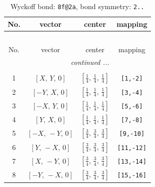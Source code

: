 \documentclass[fleqn,8pt]{jsarticle}
\begin{document}
\begin{longtable}{cccc}
\caption{Wyckoff bond: {\tt 8f@2a}, bond symmetry: {\tt 2..}}
 \\
 \hline \hline
No. & vector & center & mapping \\ \hline \endfirsthead

\multicolumn{3}{l}{\tablename\ \thetable{}} \\
 \hline \hline
No. & vector & center & mapping \\ \hline \endhead

 \hline \hline
\multicolumn{3}{r}{\footnotesize\it continued ...} \\ \endfoot

 \hline \hline
\multicolumn{3}{r}{} \\ \endlastfoot

1 & $\left[ X,\, Y,\, 0 \right]$ & $\left[ \frac{1}{4},\, \frac{1}{4},\, \frac{1}{4} \right]$ & {\tt [1,-2]} \\ \hline
2 & $\left[ - Y,\, X,\, 0 \right]$ & $\left[ \frac{1}{4},\, \frac{1}{4},\, \frac{1}{4} \right]$ & {\tt [3,-4]} \\ \hline
3 & $\left[ - X,\, Y,\, 0 \right]$ & $\left[ \frac{1}{4},\, \frac{1}{4},\, \frac{1}{4} \right]$ & {\tt [5,-6]} \\ \hline
4 & $\left[ Y,\, X,\, 0 \right]$ & $\left[ \frac{1}{4},\, \frac{1}{4},\, \frac{1}{4} \right]$ & {\tt [7,-8]} \\ \hline
5 & $\left[ - X,\, - Y,\, 0 \right]$ & $\left[ \frac{3}{4},\, \frac{3}{4},\, \frac{3}{4} \right]$ & {\tt [9,-10]} \\ \hline
6 & $\left[ Y,\, - X,\, 0 \right]$ & $\left[ \frac{3}{4},\, \frac{3}{4},\, \frac{3}{4} \right]$ & {\tt [11,-12]} \\ \hline
7 & $\left[ X,\, - Y,\, 0 \right]$ & $\left[ \frac{3}{4},\, \frac{3}{4},\, \frac{3}{4} \right]$ & {\tt [13,-14]} \\ \hline
8 & $\left[ - Y,\, - X,\, 0 \right]$ & $\left[ \frac{3}{4},\, \frac{3}{4},\, \frac{3}{4} \right]$ & {\tt [15,-16]} \\
\end{longtable}
\renewcommand{\arraystretch}{1.2}
\end{document}
